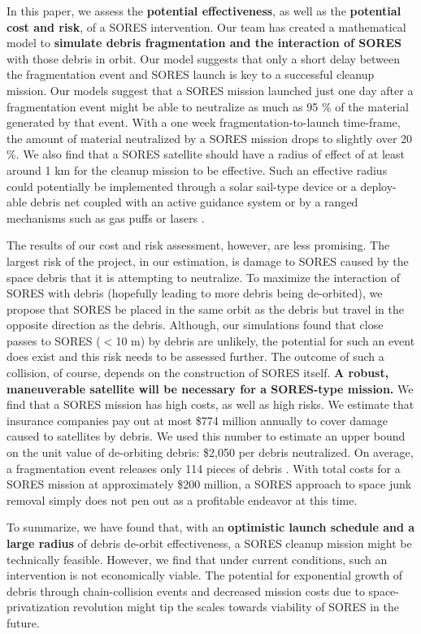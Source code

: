 \documentclass[12pt]{scrartcl}
\begin{document}
In this paper, we assess the \textbf{potential effectiveness}, as well as the \textbf{potential cost and risk}, of a SORES intervention. Our team has created a mathematical model to \textbf{simulate debris fragmentation and the interaction of SORES} with those debris in orbit. Our model suggests that only a short delay between the fragmentation event and SORES launch is key to a successful cleanup mission. Our models suggest that a SORES mission launched just one day after a fragmentation event might be able to neutralize as much as 95 \% of the material generated by that event. With a one week fragmentation-to-launch time-frame, the amount of material neutralized by a SORES mission drops to slightly over 20 \%. We also find that a SORES satellite should have a radius of effect of at least around 1 km for the cleanup mission to be effective. Such an effective radius could potentially be implemented through a solar sail-type device or a deploy-able debris net coupled with an active guidance system or by a ranged mechanisms such as gas puffs or lasers \cite{tether} \cite{sail} \cite{net}. 

The results of our cost and risk assessment, however, are less promising. The largest risk of the project, in our estimation, is damage to SORES caused by the space debris that it is attempting to neutralize. To maximize the interaction of SORES with debris (hopefully leading to more debris being de-orbited), we propose that SORES be placed in the same orbit as the debris but travel in the opposite direction as the debris. Although, our simulations found that close passes to SORES (\(<\)10 m) by debris are unlikely, the potential for such an event does exist and this risk needs to be assessed further. The outcome of such a collision, of course, depends on the construction of SORES itself. \textbf{A robust, maneuverable satellite will be necessary for a SORES-type mission.} We find that a SORES mission has high costs, as well as high risks. We estimate that insurance companies pay out at most \$774 million annually to cover damage caused to satellites by debris. We used this number to estimate an upper bound on the unit value of de-orbiting debris: \$2,050 per debris neutralized. On average, a fragmentation event releases only 114 pieces of debris \cite{excel}. With total costs for a SORES mission at approximately \$200 million, a SORES approach to space junk removal simply does not pen out as a profitable endeavor at this time.

To summarize, we have found that, with an \textbf{optimistic launch schedule and a large radius} of debris de-orbit effectiveness, a SORES cleanup mission might be technically feasible. However, we find that under current conditions, such an intervention is not economically viable. The potential for exponential growth of debris through chain-collision events and decreased mission costs due to space-privatization revolution might tip the scales towards viability of SORES in the future.
\end{document}
